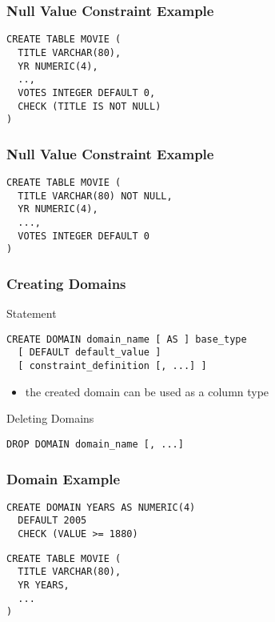 \documentclass[dvipsnames]{beamer}
\theoremstyle{plain}
\begin{document}
\begin{frame}[fragile]
  \frametitle{Null Value Constraint Example}

  \begin{example}
    \begin{lstlisting}
CREATE TABLE MOVIE (
  TITLE VARCHAR(80),
  YR NUMERIC(4),
  ..,
  VOTES INTEGER DEFAULT 0,
  CHECK (TITLE IS NOT NULL)
)
    \end{lstlisting}
  \end{example}
\end{frame}

\begin{frame}[fragile]
  \frametitle{Null Value Constraint Example}

  \begin{example}
    \begin{lstlisting}
CREATE TABLE MOVIE (
  TITLE VARCHAR(80) NOT NULL,
  YR NUMERIC(4),
  ...,
  VOTES INTEGER DEFAULT 0
)
    \end{lstlisting}
  \end{example}
\end{frame}

\begin{frame}[fragile]
  \frametitle{Creating Domains}

  \begin{block}{Statement}
    \begin{lstlisting}
CREATE DOMAIN domain_name [ AS ] base_type
  [ DEFAULT default_value ]
  [ constraint_definition [, ...] ]
    \end{lstlisting}
  \end{block}

  \pause
  \begin{itemize}
    \item the created domain can be used as a column type
  \end{itemize}

  \pause
  \begin{block}{Deleting Domains}
    \begin{lstlisting}
DROP DOMAIN domain_name [, ...]
    \end{lstlisting}
  \end{block}
\end{frame}

\begin{frame}[fragile]
  \frametitle{Domain Example}

  \begin{example}
    \begin{lstlisting}
CREATE DOMAIN YEARS AS NUMERIC(4)
  DEFAULT 2005
  CHECK (VALUE >= 1880)
    \end{lstlisting}

    \pause
    \begin{lstlisting}
CREATE TABLE MOVIE (
  TITLE VARCHAR(80),
  YR YEARS,
  ...
)
    \end{lstlisting}
  \end{example}
\end{frame}
\end{document}
